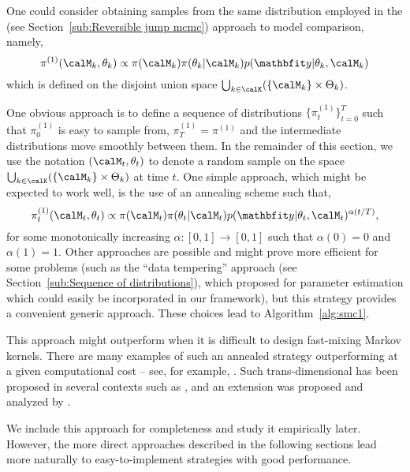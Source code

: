 One could consider obtaining samples from the same distribution employed in
the \rjmcmc (see Section~\ref{sub:Reversible jump mcmc}) approach to model
comparison, namely,
\begin{equation}
  \pi^{(1)}(\calM_k,\theta_k) \propto
  \pi(\calM_k)\pi(\theta_k|\calM_k)p(\data|\theta_k,\calM_k)
\end{equation}
which is defined on the disjoint union space
$\bigcup_{k\in\calK}(\{\calM_k\}\times\Theta_k)$.

One obvious \smc approach is to define a sequence of distributions
$\{\pi_t^{(1)}\}_{t=0}^T$ such that $\pi^{(1)}_0$ is easy to sample from,
$\pi_{T}^{(1)} = \pi^{(1)}$ and the intermediate distributions move smoothly
between them. In the remainder of this section, we use the notation
$(\calM_t,\theta_t)$ to denote a random sample on the space
$\bigcup_{k\in\calK}(\{\calM_k\}\times\Theta_k)$ at time $t$. One simple
approach, which might be expected to work well, is the use of an annealing
scheme such that,
\begin{equation}
  \pi^{(1)}_t(\calM_t,\theta_t) \propto \pi(\calM_t)\pi(\theta_t|\calM_t)
  p(\data|\theta_t,\calM_t)^{\alpha(t/T)},
  \label{eq:geometry_1}
\end{equation}
for some monotonically increasing $\alpha:[0,1]\to[0,1]$ such that $\alpha(0)
= 0$ and $\alpha(1) = 1$. Other approaches are possible and might prove more
efficient for some problems (such as the ``data tempering'' approach (see
Section~\ref{sub:Sequence of distributions}), which \cite{Chopin:2002hg}
proposed for parameter estimation which could easily be incorporated in our
framework), but this strategy provides a convenient generic approach. These
choices lead to Algorithm~\ref{alg:smc1}.



This approach might outperform \rjmcmc when it is difficult to design
fast-mixing Markov kernels. There are many examples of such an annealed \smc
strategy outperforming \mcmc at a given computational cost -- see, for
example, \cite{Fan:2008tf,Johansen:2008kp,Fearnhead:2010ua}. Such
trans-dimensional \smc has been proposed in several contexts such as
\cite{Peters:2005wh}, and an extension was proposed and analyzed by
\cite{Jasra:2008bb}.

We include this approach for completeness and study it empirically later.
However, the more direct approaches described in the following sections lead
more naturally to easy-to-implement strategies with good performance.

